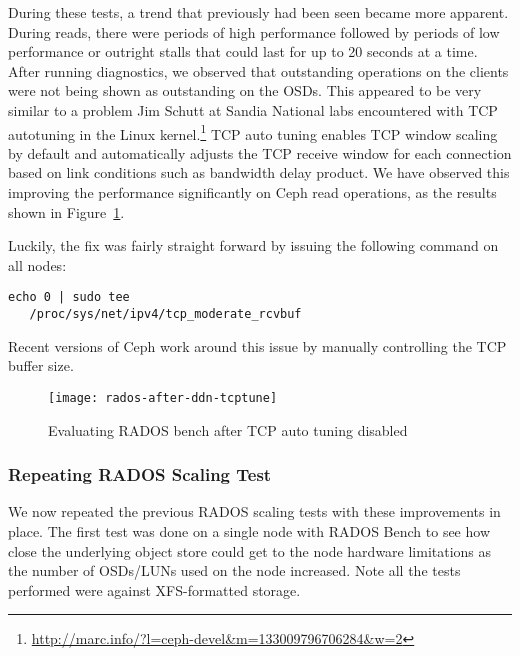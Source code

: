 During these tests, a trend that previously had been seen became more apparent.
During reads, there were periods of high performance followed by periods of low
performance or outright stalls that could last for up to 20 seconds at a time.
After running diagnostics, we observed that outstanding operations on the
clients were not being shown as outstanding on the OSDs.  This appeared to be
very similar to a problem Jim Schutt at Sandia National labs encountered with
TCP autotuning in the Linux
kernel.\footnote{\url{http://marc.info/?l=ceph-devel&m=133009796706284&w=2}}
TCP auto tuning enables TCP window scaling by default and automatically adjusts
the TCP receive window for each connection based on link conditions such as
bandwidth delay product. We have observed this improving the performance
significantly on Ceph read operations, as the results shown in
Figure~\ref{fig:rados-tcp-auto-disabled}.


Luckily, the fix was fairly straight forward by issuing the following command
on all nodes:

\begin{Verbatim}[fontsize=\small]
 echo 0 | sudo tee 
   /proc/sys/net/ipv4/tcp_moderate_rcvbuf
\end{Verbatim}

Recent versions of Ceph work around this issue by manually controlling the TCP
buffer size.  

\begin{figure}[htb]
\centering
\texttt{[image: rados-after-ddn-tcptune]}
\caption{Evaluating RADOS bench after TCP auto tuning disabled}
\label{fig:rados-tcp-auto-disabled}
\end{figure}




\subsubsection{Repeating RADOS Scaling Test}

We now repeated the previous RADOS scaling tests with these improvements in place.
The first test was done on a single node with RADOS Bench to see how close the
underlying object store could get to the node hardware limitations as the number
of OSDs/LUNs used on the node increased. Note all the tests performed were against
XFS-formatted storage.

